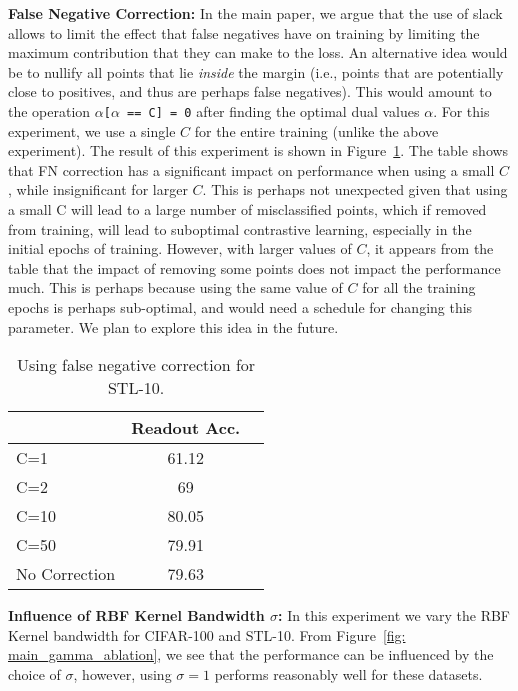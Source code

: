 \documentclass[letterpaper]{article} \usepackage{aaai22}  \usepackage{times}  \usepackage{helvet}  \usepackage{courier}  \usepackage[hyphens]{url}  \usepackage{graphicx} \urlstyle{rm} \def\UrlFont{\rm}  \usepackage{natbib}  \usepackage{caption} \DeclareCaptionStyle{ruled}{labelfont=normalfont,labelsep=colon,strut=off} \frenchspacing  \setlength{\pdfpagewidth}{8.5in}  \setlength{\pdfpageheight}{11in}
\begin{document}
\noindent\textbf{False Negative Correction:}
In the main paper, we argue that the use of slack allows to limit the effect that false negatives have on training by limiting the maximum contribution that they can make to the loss. An alternative idea would be to nullify all points that lie \emph{inside} the margin (i.e., points that are potentially close to positives, and thus are perhaps false negatives). This would amount to the operation \texttt{$\alpha$[$\alpha$ == C] = 0} after finding the optimal dual values $\alpha$. For this experiment, we use a single $C$ for the entire training (unlike the above experiment). The result of this experiment is shown in Figure~\ref{tab: C_FN_correction}. The table shows that FN correction has a significant impact on performance when using a small $C$, while insignificant for larger $C$. This is perhaps not unexpected given that using a small C will lead to a large number of misclassified points, which if removed from training, will lead to suboptimal contrastive learning, especially in the initial epochs of training. However, with larger values of $C$, it appears from the table that the impact of removing some points does not impact the performance much. This is perhaps because using the same value of $C$ for all the training epochs is perhaps sub-optimal, and would need a schedule for changing this parameter. We plan to explore this idea in the future.

\begin{table}[]
    \centering
    \begin{tabular}{lcr}
    \toprule
      & Readout Acc. \\
    \midrule
    C=1  & 61.12  \\
    C=2 & 69   \\
    C=10  & 80.05  \\
    C=50  & 79.91    \\
    No Correction  & 79.63   \\
    \bottomrule
    \end{tabular}
     \caption{Using false negative correction for STL-10.}
    \label{tab: C_FN_correction}
\end{table}

\noindent\textbf{Influence of RBF Kernel Bandwidth $\sigma$:}
In this experiment we vary the RBF Kernel bandwidth for CIFAR-100 and STL-10. From Figure~\ref{fig: main_gamma_ablation},  we see that the performance can be influenced by the choice of $\sigma$, however, using $\sigma=1$ performs reasonably well for these datasets. 
\end{document}
